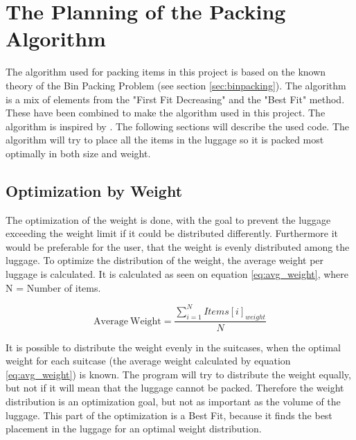 \section{The Planning of the Packing Algorithm}
\label{sec:algorithm}
The algorithm used for packing items in this project is based on the known theory of the Bin Packing Problem (see section \ref{sec:binpacking}). The algorithm is a mix of elements from the "First Fit Decreasing" and the "Best Fit" method. These have been combined to make the algorithm used in this project. The algorithm is inspired by \citep{three-dim-pack}. The following sections will describe the used code.
The algorithm will try to place all the items in the luggage so it is packed most optimally in both size and weight.

\subsection{Optimization by Weight}
The optimization of the weight is done, with the goal to prevent the luggage exceeding the weight limit if it could be distributed differently. Furthermore it would be preferable for the user, that the weight is evenly distributed among the luggage.
To optimize the distribution of the weight, the average weight per luggage is calculated. It is calculated as seen on equation \ref{eq:avg_weight}, where N = Number of items.

\begin{equation}
	\label{eq:avg_weight}
	\mathrm{Average~Weight} = \frac{\displaystyle\sum_{i=1}^{N} Items[i]_{weight}}{N}
\end{equation}

It is possible to distribute the weight evenly in the suitcases, when the optimal weight for each suitcase (the average weight calculated by equation \ref{eq:avg_weight}) is known. The program will try to distribute the weight equally, but not if it will mean that the luggage cannot be packed. Therefore the weight distribution is an optimization goal, but not as important as the volume of the luggage. This part of the optimization is a Best Fit, because it finds the best placement in the luggage for an optimal weight distribution.

